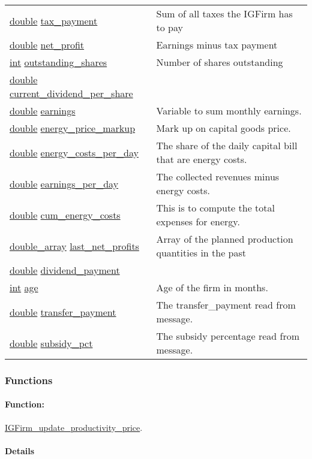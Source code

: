 \documentclass[a4paper,11pt]{article}
\begin{document}
\begin{center}
\begin{longtable}[H!]{ll}
\url{double} \url{tax_payment} & \parbox{10cm}{Sum of all taxes the IGFirm has to pay} \\
\url{double} \url{net_profit} & \parbox{10cm}{Earnings minus tax payment} \\
\url{int} \url{outstanding_shares} & \parbox{10cm}{Number of shares outstanding} \\
\url{double} \url{current_dividend_per_share} & \parbox{10cm}{} \\
\url{double} \url{earnings} & \parbox{10cm}{Variable to sum monthly earnings.} \\
\url{double} \url{energy_price_markup} & \parbox{10cm}{Mark up on capital goods price.} \\
\url{double} \url{energy_costs_per_day} & \parbox{10cm}{The share of the daily capital bill that are energy costs.} \\
\url{double} \url{earnings_per_day} & \parbox{10cm}{The collected revenues minus energy costs.} \\
\url{double} \url{cum_energy_costs} & \parbox{10cm}{This is to compute the total expenses for energy.} \\
\url{double_array} \url{last_net_profits} & \parbox{10cm}{Array of the planned production quantities in the past} \\
\url{double} \url{dividend_payment} & \parbox{10cm}{} \\
\url{int} \url{age} & \parbox{10cm}{Age of the firm in months.} \\
\url{double} \url{transfer_payment} & \parbox{10cm}{The transfer\_payment read from message.} \\
\url{double} \url{subsidy_pct} & \parbox{10cm}{The subsidy percentage read from message.} \\
\end{longtable}
\end{center}
\subsubsection{Functions}
\paragraph{Function:}\url{IGFirm_update_productivity_price}.

\paragraph{Details}
\begin{verbatim}
\end{verbatim}
\end{document}

